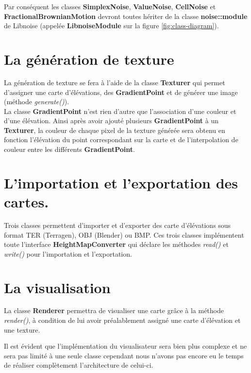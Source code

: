 Par conséquent les classes \textbf{SimplexNoise}, \textbf{ValueNoise},
\textbf{CellNoise} et \textbf{FractionalBrownianMotion} devront toutes hériter
de la classe \textbf{noise::module} de Libnoise (appelée \textbf{LibnoiseModule} sur
la figure \ref{fig:class-diagram}).

\section{La génération de texture}
La génération de texture se fera à l'aide de la classe \textbf{Texturer} qui
permet d'assigner une carte d'élévations, des \textbf{GradientPoint} et de
générer une image (méthode \emph{generate()}).\\

La classe \textbf{GradientPoint} n'est rien d'autre que l'association d'une
couleur et d'une élévation. Ainsi après avoir ajouté plusieurs
\textbf{GradientPoint} à un \textbf{Texturer}, la couleur de chaque pixel de la
texture générée sera obtenu en fonction l'élévation du point correspondant
sur la carte et de l'interpolation de couleur entre les différents
\textbf{GradientPoint}.

\section{L'importation et l'exportation des cartes.}
Trois classes permettent d'importer et d'exporter des carte d'élévations sous
format TER (Terragen), OBJ (Blender) ou BMP. Ces trois classes implémentent
toute l'interface \textbf{HeightMapConverter} qui déclare les méthodes
\emph{read()} et \emph{write()} pour l'importation et l'exportation.

\section{La visualisation}
La classe \textbf{Renderer} permettra de visualiser une carte grâce à la méthode
\emph{render()}, à condition de lui avoir préalablement assigné une carte
d'élévation et une texture.

Il est évident que l'implémentation du visualisateur sera bien plus complexe et
ne sera pas limité à une seule classe cependant nous n'avons pas encore eu le
temps de réaliser complètement l'architecture de celui-ci.
